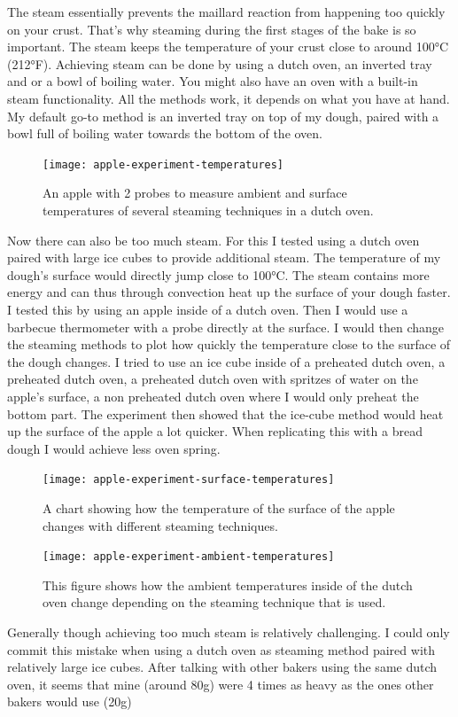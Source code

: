The steam essentially prevents the maillard reaction from happening too quickly
on your crust. That's why steaming during the first stages of the bake is so important.
The steam keeps the temperature of your crust close to around 100°C (212°F). Achieving steam
can be done by using a dutch oven, an inverted tray and or a bowl of boiling water.
You might also have an oven with a built-in steam functionality. All the methods work,
it depends on what you have at hand. My default go-to method is an inverted
tray on top of my dough, paired with a bowl full of boiling water towards the bottom
of the oven.

\begin{figure}
  \texttt{[image: apple-experiment-temperatures]}
  \caption{An apple with 2 probes to measure ambient
  and surface temperatures of several steaming techniques
  in a dutch oven.}
  \label{apple-experiment-temperatures}
\end{figure}

Now there can also be too much steam. For this I tested using a dutch oven paired with large ice
cubes to provide additional steam. The temperature of my dough's surface would directly
jump close to 100°C. The steam contains more energy and can thus through convection
heat up the surface of your dough faster. I tested this by using an apple inside of
a dutch oven. Then I would use a barbecue thermometer with a probe directly at the surface.
I would then change the steaming methods to plot how quickly the temperature
close to the surface of the dough changes. I tried to use an ice cube inside of a preheated
dutch oven, a preheated dutch oven, a preheated dutch oven with spritzes
of water on the apple's surface, a non preheated dutch oven where I would only preheat
the bottom part. The experiment then showed that the ice-cube method would heat up
the surface of the apple a lot quicker. When replicating this with a bread dough
I would achieve less oven spring.

\begin{figure}[h]
  \texttt{[image: apple-experiment-surface-temperatures]}
  \caption{A chart showing how the temperature of the surface
  of the apple changes with different steaming techniques.}
  \label{apple-experiment-surface-temperatures}
\end{figure}

\begin{figure}[h]
  \texttt{[image: apple-experiment-ambient-temperatures]}
  \caption{This figure shows how the ambient temperatures inside of the
  dutch oven change depending on the steaming technique that is used.}
  \label{apple-experiment-ambient-temperatures}
\end{figure}

Generally though achieving too much steam is relatively challenging. I could only
commit this mistake when using a dutch oven as steaming method paired with relatively
large ice cubes. After talking with other bakers using the same dutch oven, it seems
that mine (around 80g) were 4 times as heavy as the ones other bakers would use (20g)